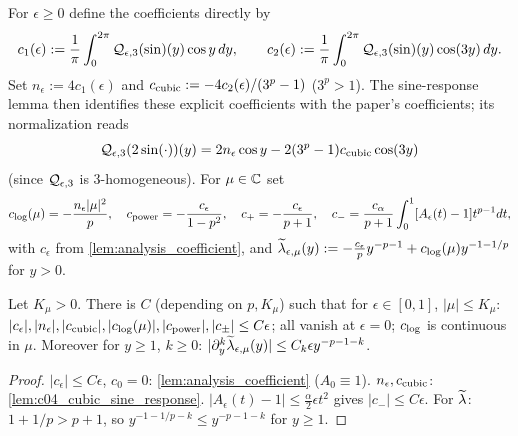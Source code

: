 \begin{definition}
  \label{def:c04_correction_constants}
  For $\epsilon\ge0$ define the coefficients directly by
  \[
    c_1(\epsilon):=\frac1\pi\int_0^{2\pi}\mathcal{Q}_{\epsilon,3}(\sin)(y)\cos y\,dy,
    \qquad
    c_2(\epsilon):=\frac1\pi\int_0^{2\pi}\mathcal{Q}_{\epsilon,3}(\sin)(y)\cos(3y)\,dy.
  \]
  Set $n_\epsilon:=4c_1(\epsilon)$ and
  $c_{\textup{cubic}}:=-4c_2(\epsilon)/(3^p-1)$ ($3^p>1$).
  The sine-response lemma then identifies these explicit coefficients with the paper's
  coefficients; its normalization reads
  \begin{equation}\label{eqn:approx_cubic_normalization}
    \mathcal{Q}_{\epsilon,3}(2\sin(\cdot))(y)=2n_\epsilon\cos y-2(3^p-1)c_{\textup{cubic}}\cos(3y)
  \end{equation}
  (since $\mathcal{Q}_{\epsilon,3}$ is $3$-homogeneous). For $\mu\in\mathbb{C}$ set
  \begin{equation}\label{eqn:approx_correction_constants}
    c_{\textup{log}}(\mu)=-\frac{n_\epsilon|\mu|^2}p,\quad c_{\textup{power}}=-\frac{c_\epsilon}{1-p^2},\quad
    c_+=-\frac{c_\epsilon}{p+1},\quad c_-=\frac{c_\alpha}{p+1}\int_0^1[A_\epsilon(t)-1]t^{p-1}dt ,
  \end{equation}
  with $c_\epsilon$ from \cref{lem:analysis_coefficient}, and
  $\widetilde{\lambda}_{\epsilon,\mu}(y):=-\frac{c_\epsilon}py^{-p-1}+c_{\textup{log}}(\mu)y^{-1-1/p}$ for $y>0$.
\end{definition}

\begin{lemma}
  \label{lem:c04_constants_small}
  Let $K_\mu>0$. There is $C$ (depending on $p,K_\mu$) such that for $\epsilon\in[0,1]$, $|\mu|\le K_\mu$:
  $|c_\epsilon|,|n_\epsilon|,|c_{\textup{cubic}}|,|c_{\textup{log}}(\mu)|,|c_{\textup{power}}|,|c_\pm|\le C\epsilon$; all vanish at $\epsilon=0$;
  $c_{\textup{log}}$ is continuous in $\mu$. Moreover for $y\ge1$, $k\ge0$: $|\partial^k_y\widetilde{\lambda}_{\epsilon,\mu}(y)|\le C_k\epsilon y^{-p-1-k}$.
\end{lemma}
\begin{proof}
  $|c_\epsilon|\le C\epsilon$, $c_0=0$: \cref{lem:analysis_coefficient} ($A_0\equiv1$). $n_\epsilon,c_{\textup{cubic}}$: \cref{lem:c04_cubic_sine_response}.
  $|A_\epsilon(t)-1|\le\frac\alpha2\epsilon t^2$ gives $|c_-|\le C\epsilon$. For $\widetilde{\lambda}$: $1+1/p>p+1$, so $y^{-1-1/p-k}\le y^{-p-1-k}$ for $y\ge1$.
\end{proof}

